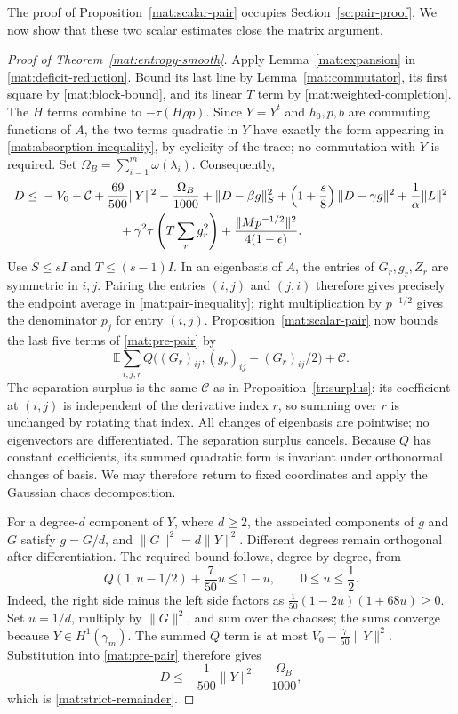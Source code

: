 \documentclass[11pt]{article}
\theoremstyle{definition}
\theoremstyle{remark}
\numberwithin{equation}{section}
\begin{document}
The proof of Proposition~\ref{mat:scalar-pair} occupies
Section~\ref{sc:pair-proof}.  We now show that these two scalar estimates
close the matrix argument.

\begin{proof}[Proof of Theorem~\ref{mat:entropy-smooth}]
Apply Lemma~\ref{mat:expansion} in
\eqref{mat:deficit-reduction}.  Bound its last line by
Lemma~\ref{mat:commutator}, its first square by
\eqref{mat:block-bound}, and its linear $T$ term by
\eqref{mat:weighted-completion}.  The $H$ terms combine to
$-\tau(H\rho p)$.  Since $Y=Y^t$ and $h_0,p,b$ are commuting functions
of $A$, the two terms quadratic in $Y$ have exactly the form appearing
in \eqref{mat:absorption-inequality}, by cyclicity of the trace;
no commutation with $Y$ is required.  Set
$\Omega_B=\sum_{i=1}^m\omega(\lambda_i)$.  Consequently,
\begin{align}
 \mathcal{} D\le {}&-V_0-\mathcal C+\frac{69}{500}\|Y\|^2
    -\frac{\Omega_B}{1000}
    +\|D-\beta g\|_S^2
    +\left(1+\frac s8\right)\|D-\gamma g\|^2
    +\frac1\alpha\|L\|^2\nonumber\\
 &\hspace{22mm}+\gamma^2\tau\left(T\sum_rg_r^2\right)
    +\frac{\|Mp^{-1/2}\|^2}{4(1-\epsilon)}.
 \label{mat:pre-pair}
\end{align}
Use $S\le s I$ and $T\le(s-1)I$.  In an eigenbasis of $A$, the
entries of $G_r,g_r,Z_r$ are symmetric in $i,j$.  Pairing the entries
$(i,j)$ and $(j,i)$ therefore gives precisely the endpoint average in
\eqref{mat:pair-inequality}; right multiplication by $p^{-1/2}$ gives
the denominator $p_j$ for entry $(i,j)$.  Proposition~\ref{mat:scalar-pair}
now bounds the last five terms of \eqref{mat:pre-pair} by
\[
 \mathbb E\sum_{i,j,r}Q\bigl((G_r)_{ij},(g_r)_{ij}-(G_r)_{ij}/2\bigr)
       +\mathcal C.
\]
The separation surplus is the same $\mathcal C$ as in
Proposition~\ref{tr:surplus}: its coefficient at $(i,j)$ is independent
of the derivative index $r$, so summing over $r$ is unchanged by rotating
that index.  All changes of eigenbasis are pointwise; no eigenvectors are
differentiated.  The separation surplus cancels.
Because $Q$ has constant coefficients,
its summed quadratic form is invariant under orthonormal changes of
basis.  We may therefore return to fixed coordinates and apply the
Gaussian chaos decomposition.

For a degree-$d$ component of $Y$, where $d\ge2$, the associated
components of $g$ and $G$ satisfy $g=G/d$, and
$\|G\|^2=d\|Y\|^2$.  Different degrees remain orthogonal after
differentiation.  The required bound follows, degree by degree, from
\begin{equation}\label{mat:final-polynomial}
 Q(1,u-1/2)+\frac7{50}u\le1-u,
 \qquad 0\le u\le\frac12.
\end{equation}
Indeed, the right side minus the left side factors as
$\frac1{50}(1-2u)(1+68u)\ge0$.  Set $u=1/d$, multiply by
$\|G\|^2$, and sum over the chaoses; the sums converge because
$Y\in H^1(\gamma_m)$.  The summed $Q$ term is at most
$V_0-\frac7{50}\|Y\|^2$.  Substitution into
\eqref{mat:pre-pair} therefore gives
\[
 \mathcal{} D\le-\frac1{500}\|Y\|^2-\frac{\Omega_B}{1000},
\]
which is \eqref{mat:strict-remainder}.
\end{proof}
\end{document}
